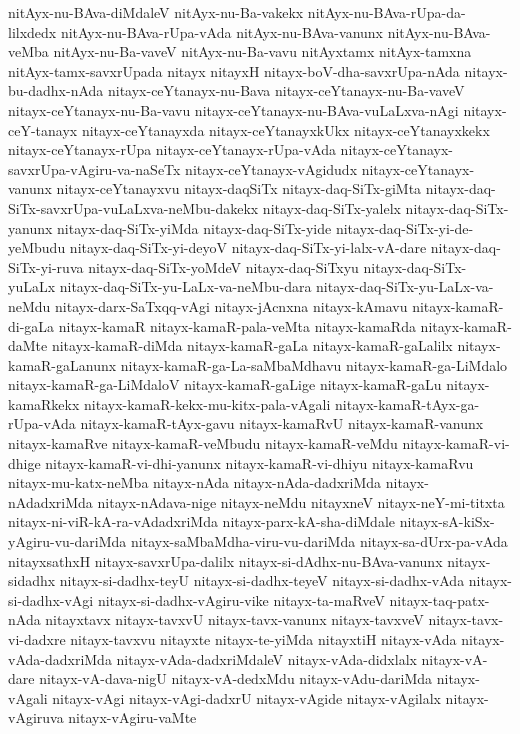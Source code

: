 {nitAyx-nu-BAva-diMdaleV
nitAyx-nu-Ba-vakekx
nitAyx-nu-BAva-rUpa-da-lilxdedx
nitAyx-nu-BAva-rUpa-vAda
nitAyx-nu-BAva-vanunx
nitAyx-nu-BAva-veMba
nitAyx-nu-Ba-vaveV
nitAyx-nu-Ba-vavu
nitAyxtamx
nitAyx-tamxna
nitAyx-tamx-savxrUpada
nitayx
nitayxH
nitayx-boV-dha-savxrUpa-nAda
nitayx-bu-dadhx-nAda
nitayx-ceYtanayx-nu-Bava
nitayx-ceYtanayx-nu-Ba-vaveV
nitayx-ceYtanayx-nu-Ba-vavu
nitayx-ceYtanayx-nu-BAva-vuLaLxva-nAgi
nitayx-ceY-tanayx
nitayx-ceYtanayxda
nitayx-ceYtanayxkUkx
nitayx-ceYtanayxkekx
nitayx-ceYtanayx-rUpa
nitayx-ceYtanayx-rUpa-vAda
nitayx-ceYtanayx-savxrUpa-vAgiru-va-naSeTx
nitayx-ceYtanayx-vAgidudx
nitayx-ceYtanayx-vanunx
nitayx-ceYtanayxvu
nitayx-daqSiTx
nitayx-daq-SiTx-giMta
nitayx-daq-SiTx-savxrUpa-vuLaLxva-neMbu-dakekx
nitayx-daq-SiTx-yalelx
nitayx-daq-SiTx-yanunx
nitayx-daq-SiTx-yiMda
nitayx-daq-SiTx-yide
nitayx-daq-SiTx-yi-de-yeMbudu
nitayx-daq-SiTx-yi-deyoV
nitayx-daq-SiTx-yi-lalx-vA-dare
nitayx-daq-SiTx-yi-ruva
nitayx-daq-SiTx-yoMdeV
nitayx-daq-SiTxyu
nitayx-daq-SiTx-yuLaLx
nitayx-daq-SiTx-yu-LaLx-va-neMbu-dara
nitayx-daq-SiTx-yu-LaLx-va-neMdu
nitayx-darx-SaTxqq-vAgi
nitayx-jAcnxna
nitayx-kAmavu
nitayx-kamaR-di-gaLa
nitayx-kamaR
nitayx-kamaR-pala-veMta
nitayx-kamaRda
nitayx-kamaR-daMte
nitayx-kamaR-diMda
nitayx-kamaR-gaLa
nitayx-kamaR-gaLalilx
nitayx-kamaR-gaLanunx
nitayx-kamaR-ga-La-saMbaMdhavu
nitayx-kamaR-ga-LiMdalo
nitayx-kamaR-ga-LiMdaloV
nitayx-kamaR-gaLige
nitayx-kamaR-gaLu
nitayx-kamaRkekx
nitayx-kamaR-kekx-mu-kitx-pala-vAgali
nitayx-kamaR-tAyx-ga-rUpa-vAda
nitayx-kamaR-tAyx-gavu
nitayx-kamaRvU
nitayx-kamaR-vanunx
nitayx-kamaRve
nitayx-kamaR-veMbudu
nitayx-kamaR-veMdu
nitayx-kamaR-vi-dhige
nitayx-kamaR-vi-dhi-yanunx
nitayx-kamaR-vi-dhiyu
nitayx-kamaRvu
nitayx-mu-katx-neMba
nitayx-nAda
nitayx-nAda-dadxriMda
nitayx-nAdadxriMda
nitayx-nAdava-nige
nitayx-neMdu
nitayxneV
nitayx-neY-mi-titxta
nitayx-ni-viR-kA-ra-vAdadxriMda
nitayx-parx-kA-sha-diMdale
nitayx-sA-kiSx-yAgiru-vu-dariMda
nitayx-saMbaMdha-viru-vu-dariMda
nitayx-sa-dUrx-pa-vAda
nitayxsathxH
nitayx-savxrUpa-dalilx
nitayx-si-dAdhx-nu-BAva-vanunx
nitayx-sidadhx
nitayx-si-dadhx-teyU
nitayx-si-dadhx-teyeV
nitayx-si-dadhx-vAda
nitayx-si-dadhx-vAgi
nitayx-si-dadhx-vAgiru-vike
nitayx-ta-maRveV
nitayx-taq-patx-nAda
nitayxtavx
nitayx-tavxvU
nitayx-tavx-vanunx
nitayx-tavxveV
nitayx-tavx-vi-dadxre
nitayx-tavxvu
nitayxte
nitayx-te-yiMda
nitayxtiH
nitayx-vAda
nitayx-vAda-dadxriMda
nitayx-vAda-dadxriMdaleV
nitayx-vAda-didxlalx
nitayx-vA-dare
nitayx-vA-dava-nigU
nitayx-vA-dedxMdu
nitayx-vAdu-dariMda
nitayx-vAgali
nitayx-vAgi
nitayx-vAgi-dadxrU
nitayx-vAgide
nitayx-vAgilalx
nitayx-vAgiruva
nitayx-vAgiru-vaMte
}
